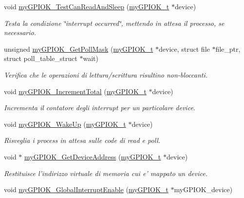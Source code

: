\begin{DoxyCompactItemize}
void \hyperlink{group__my_g_p_i_o_k__t_gaf1b6f35c097c46361d675a42f122828e}{my\+G\+P\+I\+O\+K\+\_\+\+Test\+Can\+Read\+And\+Sleep} (\hyperlink{structmy_g_p_i_o_k__t}{my\+G\+P\+I\+O\+K\+\_\+t} $\ast$device)
\begin{DoxyCompactList}\small\item\em Testa la condizione \char`\"{}interrupt occurred\char`\"{}, mettendo in attesa il processo, se necessario. \end{DoxyCompactList}\item 
unsigned \hyperlink{group__my_g_p_i_o_k__t_gae428f50a6da69e3cf89348b8ba9401b1}{my\+G\+P\+I\+O\+K\+\_\+\+Get\+Poll\+Mask} (\hyperlink{structmy_g_p_i_o_k__t}{my\+G\+P\+I\+O\+K\+\_\+t} $\ast$device, struct file $\ast$file\+\_\+ptr, struct poll\+\_\+table\+\_\+struct $\ast$wait)
\begin{DoxyCompactList}\small\item\em Verifica che le operazioni di lettura/scrittura risultino non-\/bloccanti. \end{DoxyCompactList}\item 
void \hyperlink{group__my_g_p_i_o_k__t_ga5a7df448de9de94620ce1baf7ec388c9}{my\+G\+P\+I\+O\+K\+\_\+\+Increment\+Total} (\hyperlink{structmy_g_p_i_o_k__t}{my\+G\+P\+I\+O\+K\+\_\+t} $\ast$device)
\begin{DoxyCompactList}\small\item\em Incrementa il contatore degli interrupt per un particolare device. \end{DoxyCompactList}\item 
void \hyperlink{group__my_g_p_i_o_k__t_gae182aa943af08c102a05795ae8526192}{my\+G\+P\+I\+O\+K\+\_\+\+Wake\+Up} (\hyperlink{structmy_g_p_i_o_k__t}{my\+G\+P\+I\+O\+K\+\_\+t} $\ast$device)
\begin{DoxyCompactList}\small\item\em Risveglia i process in attesa sulle code di read e poll. \end{DoxyCompactList}\item 
void $\ast$ \hyperlink{group__my_g_p_i_o_k__t_ga565ffd4946b330b29e1166dfc9851b11}{my\+G\+P\+I\+O\+K\+\_\+\+Get\+Device\+Address} (\hyperlink{structmy_g_p_i_o_k__t}{my\+G\+P\+I\+O\+K\+\_\+t} $\ast$device)
\begin{DoxyCompactList}\small\item\em Restituisce l'indirizzo virtuale di memoria cui e' mappato un device. \end{DoxyCompactList}\item 
void \hyperlink{group__my_g_p_i_o_k__t_ga00a24f28b49c71aaa91f66be71a3895b}{my\+G\+P\+I\+O\+K\+\_\+\+Global\+Interrupt\+Enable} (\hyperlink{structmy_g_p_i_o_k__t}{my\+G\+P\+I\+O\+K\+\_\+t} $\ast$my\+G\+P\+I\+O\+K\+\_\+device)

\end{DoxyCompactItemize}
